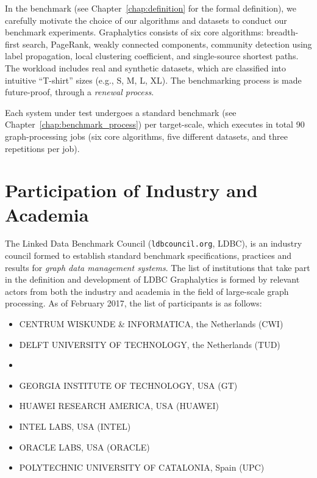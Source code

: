 In the benchmark (see Chapter~\ref{chap:definition} for the formal definition), we carefully motivate the choice of our algorithms and datasets to conduct our benchmark experiments. Graphalytics consists of six core algorithms: breadth-first search, PageRank, weakly connected components, community detection using label propagation, local clustering coefficient, and single-source shortest paths. The workload includes real and synthetic datasets, which are classified into intuitive ``T-shirt'' sizes (e.g., S, M, L, XL). The benchmarking process is made future-proof, through a {\it renewal process}. 

Each system under test undergoes a standard benchmark (see Chapter~\ref{chap:benchmark_process}) per target-scale, which executes in total 90 graph-processing jobs (six core algorithms, five different datasets, and three repetitions per job).


\section{Participation of Industry and Academia}
The Linked Data Benchmark Council ({\footnotesize\tt ldbcouncil.org}, LDBC), is an industry council formed to 
establish standard benchmark specifications, practices and results for {\em graph data management systems}. The list of institutions that take part in the definition and development of LDBC Graphalytics is formed by relevant actors from both the industry and academia in the field of large-scale graph processing. As of February 2017, the list of participants is as follows:

\begin{itemize}
	\item \MakeUppercase{Centrum Wiskunde \& Informatica}, the Netherlands (CWI)
	\item \MakeUppercase{Delft University of Technology}, the Netherlands (TUD)
	\item {}
	\item \MakeUppercase{Georgia Institute of Technology}, USA (GT)
	\item \MakeUppercase{Huawei Research America}, USA (HUAWEI)
	\item \MakeUppercase{Intel Labs}, USA (INTEL)
	\item \MakeUppercase{Oracle Labs}, USA (ORACLE)
	\item \MakeUppercase{Polytechnic University of Catalonia}, Spain (UPC)
\end{itemize}
